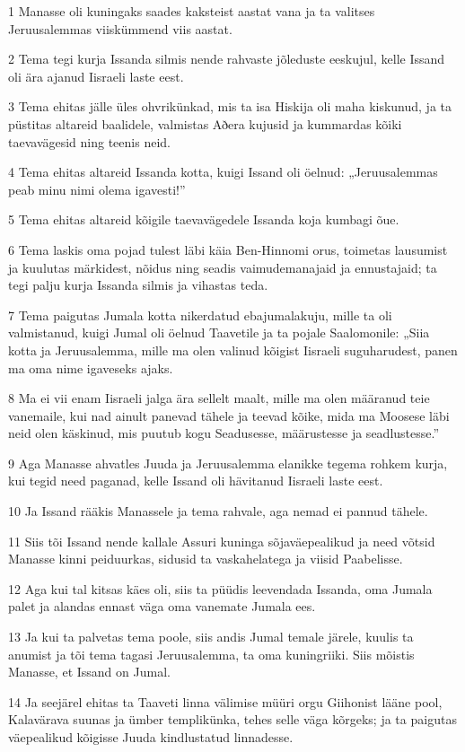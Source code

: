 \par 1 Manasse oli kuningaks saades kaksteist aastat vana ja ta valitses Jeruusalemmas viiskümmend viis aastat.
\par 2 Tema tegi kurja Issanda silmis nende rahvaste jõleduste eeskujul, kelle Issand oli ära ajanud Iisraeli laste eest.
\par 3 Tema ehitas jälle üles ohvrikünkad, mis ta isa Hiskija oli maha kiskunud, ja ta püstitas altareid baalidele, valmistas Aðera kujusid ja kummardas kõiki taevavägesid ning teenis neid.
\par 4 Tema ehitas altareid Issanda kotta, kuigi Issand oli öelnud: „Jeruusalemmas peab minu nimi olema igavesti!”
\par 5 Tema ehitas altareid kõigile taevavägedele Issanda koja kumbagi õue.
\par 6 Tema laskis oma pojad tulest läbi käia Ben-Hinnomi orus, toimetas lausumist ja kuulutas märkidest, nõidus ning seadis vaimudemanajaid ja ennustajaid; ta tegi palju kurja Issanda silmis ja vihastas teda.
\par 7 Tema paigutas Jumala kotta nikerdatud ebajumalakuju, mille ta oli valmistanud, kuigi Jumal oli öelnud Taavetile ja ta pojale Saalomonile: „Siia kotta ja Jeruusalemma, mille ma olen valinud kõigist Iisraeli suguharudest, panen ma oma nime igaveseks ajaks.
\par 8 Ma ei vii enam Iisraeli jalga ära sellelt maalt, mille ma olen määranud teie vanemaile, kui nad ainult panevad tähele ja teevad kõike, mida ma Moosese läbi neid olen käskinud, mis puutub kogu Seadusesse, määrustesse ja seadlustesse.”
\par 9 Aga Manasse ahvatles Juuda ja Jeruusalemma elanikke tegema rohkem kurja, kui tegid need paganad, kelle Issand oli hävitanud Iisraeli laste eest.
\par 10 Ja Issand rääkis Manassele ja tema rahvale, aga nemad ei pannud tähele.
\par 11 Siis tõi Issand nende kallale Assuri kuninga sõjaväepealikud ja need võtsid Manasse kinni peiduurkas, sidusid ta vaskahelatega ja viisid Paabelisse.
\par 12 Aga kui tal kitsas käes oli, siis ta püüdis leevendada Issanda, oma Jumala palet ja alandas ennast väga oma vanemate Jumala ees.
\par 13 Ja kui ta palvetas tema poole, siis andis Jumal temale järele, kuulis ta anumist ja tõi tema tagasi Jeruusalemma, ta oma kuningriiki. Siis mõistis Manasse, et Issand on Jumal.
\par 14 Ja seejärel ehitas ta Taaveti linna välimise müüri orgu Giihonist lääne pool, Kalavärava suunas ja ümber templikünka, tehes selle väga kõrgeks; ja ta paigutas väepealikud kõigisse Juuda kindlustatud linnadesse.
